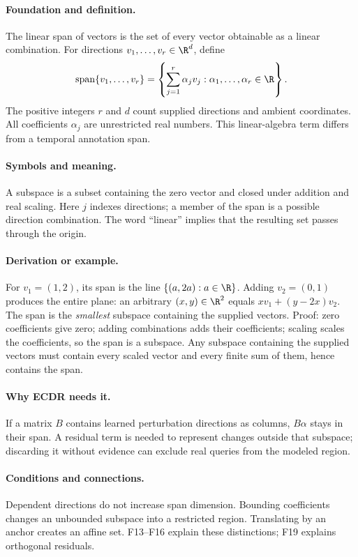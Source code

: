 \paragraph{Foundation and definition.}
The linear span of vectors is the set of every vector obtainable as a
linear combination. For directions $v_1,\ldots,v_r\in\R^d$, define
\[
 \operatorname{span}\{v_1,\ldots,v_r\}
 =\left\{\sum_{j=1}^{r}\alpha_jv_j:
                   \alpha_1,\ldots,\alpha_r\in\R\right\}.
\]
The positive integers $r$ and $d$ count supplied directions and ambient
coordinates. All coefficients $\alpha_j$ are unrestricted real numbers.
This linear-algebra term differs from a temporal annotation span.
\paragraph{Symbols and meaning.}
A subspace is a subset containing the zero vector and closed under
addition and real scaling. Here $j$ indexes directions; a member of the
span is a possible direction combination. The word ``linear'' implies
that the resulting set passes through the origin.
\paragraph{Derivation or example.}
For $v_1=(1,2)$, its span is the line
$\{(a,2a):a\in\R\}$. Adding $v_2=(0,1)$ produces the entire plane:
an arbitrary $(x,y)\in\R^2$ equals $xv_1+(y-2x)v_2$.
The span is the \emph{smallest} subspace containing the supplied vectors.
Proof: zero coefficients give zero; adding combinations adds their
coefficients; scaling scales the coefficients, so the span is a subspace.
Any subspace containing the supplied vectors must contain every scaled
vector and every finite sum of them, hence contains the span.
\paragraph{Why ECDR needs it.}
If a matrix $B$ contains learned perturbation directions as columns,
$B\alpha$ stays in their span. A residual term is needed to represent
changes outside that subspace; discarding it without evidence can exclude
real queries from the modeled region.
\paragraph{Conditions and connections.}
Dependent directions do not increase span dimension. Bounding
coefficients changes an unbounded subspace into a restricted region.
Translating by an anchor creates an affine set. F13--F16 explain these
distinctions; F19 explains orthogonal residuals.

